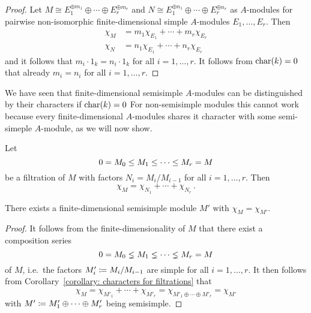 \begin{proof}
  Let $M \cong E_1^{\oplus m_1} \oplus \dotsb \oplus E_r^{\oplus m_r}$ and $N \cong E_1^{\oplus n_1} \oplus \dotsb \oplus E_r^{\oplus n_r}$ as $A$-modules for pairwise non-isomorphic finite-dimensional simple $A$-modules $E_1, \dotsc, E_r$.
  Then
  \begin{align*}
    \chi_M &= m_1 \chi_{E_1} + \dotsb + m_r \chi_{E_r}  \\
    \chi_N &= n_1 \chi_{E_1} + \dotsb + n_r \chi_{E_r}
  \end{align*}
  and it follows that $m_i \cdot 1_k = n_i \cdot 1_k$ for all $i = 1, \dotsc, r$.
  It follows from $\operatorname{char}(k) = 0$ that already $m_i = n_i$ for all $i = 1, \dotsc, r$.
\end{proof}


\begin{fluff}
  We have seen that finite-dimensional semisimple $A$-modules can be distinguished by their characters if $\operatorname{char}(k) = 0$
  For non-semisimple modules this cannot work because every finite-dimensional $A$-modules shares it character with some semi-simeple $A$-module, as we will now show.
\end{fluff}


\begin{corollary}
  \label{corollary: characters for filtrations}
  Let
  \[
                0
    =           M_0
    \leq  M_1
    \leq  \dotsb
    \leq  M_r
    =           M
  \]
  be a filtration of $M$ with factors $N_i = M_i/M_{i-1}$ for all $i = 1, \dotsc, r$.
  Then
  \[
      \chi_M
    = \chi_{N_1} + \dotsb + \chi_{N_r} \,.
  \]
\end{corollary}




\begin{corollary}
  There exists a finite-dimensional semisimple module $M'$ with $\chi_M = \chi_{M'}$.
\end{corollary}


\begin{proof}
  It follows from the finite-dimensionality of $M$ that there exist a composition series
  \[
                  0
    =             M_0
    \lneq   M_1
    \lneq   \dotsb
    \lneq   M_r
    =             M
  \]
  of $M$, i.e.\ the factors $M'_i \coloneqq M_i/M_{i-1}$ are simple for all $i = 1, \dotsc, r$.
  It then follows from Corollary~\ref{corollary: characters for filtrations} that
  \[
      \chi_M
    = \chi_{M'_1} + \dotsb + \chi_{M'_r}
    = \chi_{M'_1 \oplus \dotsb \oplus M'_r}
    = \chi_{M'}
  \]
  with $M' \coloneqq M'_1 \oplus \dotsb \oplus M'_r$ being semisimple.
\end{proof}




